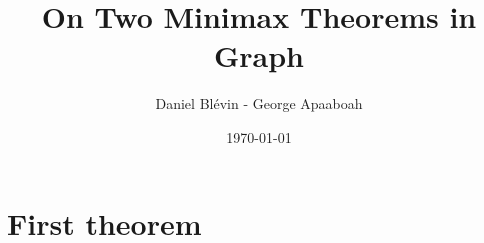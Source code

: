 \documentclass[8pt]{beamer}
\title{On Two Minimax Theorems in Graph}
\author{Daniel Blévin - George Apaaboah}
\date\today
\begin{document}
\maketitle

\begin{frame}
\tableofcontents
\end{frame}

\newtheorem{edmonds_theorem}{THEOREM}
\newtheorem{Lucchesi_and_Younger}{THEOREM}

\section{First theorem}



\end{document}
